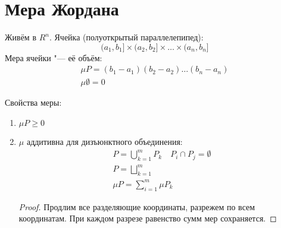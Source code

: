 \section{Мера Жордана}

\begin{Def}
	Живём в $R^n$. Ячейка (полуоткрытый параллелепипед):
	\[ (a_1, b_1] \times (a_2, b_2] \times \dots \times (a_n, b_n] \]
	Мера ячейки "--- её объём:
	\begin{gather*}
		\mu P = (b_1 - a_1) (b_2 - a_2) \dots (b_n - a_n) \\
		\mu \emptyset = 0
	\end{gather*}
\end{Def}
Свойства меры:
\begin{enumerate}
\item
	$\mu P \ge 0$

\item
	$\mu$ аддитивна для дизъюнктного объединения:
	\begin{gather*}
		P = \bigcup_{k=1}^m P_k \quad P_i \cap P_j = \emptyset \\
		P = \bigsqcup_{k=1}^m \\
		\mu P = \sum_{i=1}^m \mu P_k
	\end{gather*}
	\begin{proof}
		Продлим все разделяющие координаты, разрежем по всем координатам. При каждом разрезе равенство сумм мер сохраняется.
	\end{proof}
\end{enumerate}

